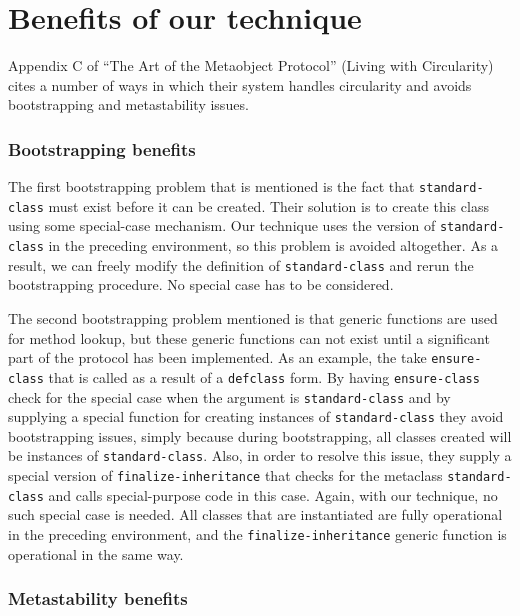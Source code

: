 \section{Benefits of our technique}
\label{sec-benefits}

Appendix C of ``The Art of the Metaobject Protocol''
\cite{Kiczales:1991:AMP:574212} (Living with Circularity) cites a
number of ways in which their system handles circularity and avoids
bootstrapping and metastability issues.

\subsubsection{Bootstrapping benefits}

The first bootstrapping problem that is mentioned is the fact that
\texttt{standard-class} must exist before it can be created.  Their
solution is to create this class using some special-case mechanism.
Our technique uses the version of \texttt{standard-class} in the
preceding environment, so this problem is avoided altogether.  As a
result, we can freely modify the definition of
\texttt{standard-class} and rerun the bootstrapping procedure.  No
special case has to be considered.

The second bootstrapping problem mentioned is that generic functions
are used for method lookup, but these generic functions can not exist
until a significant part of the protocol has been implemented.  As an
example, the take \texttt{ensure-class} that is called as a result of
a \texttt{defclass} form.  By having \texttt{ensure-class} check for
the special case when the argument is \texttt{standard-class} and by
supplying a special function for creating instances of
\texttt{standard-class} they avoid bootstrapping issues, simply
because during bootstrapping, all classes created will be instances of
\texttt{standard-class}.  Also, in order to resolve this issue, they
supply a special version of \texttt{finalize-inheritance} that checks
for the metaclass \texttt{standard-class} and calls special-purpose
code in this case.  Again, with our technique, no such special case is
needed.  All classes that are instantiated are fully operational in
the preceding environment, and the \texttt{finalize-inheritance}
generic function is operational in the same way.

\subsubsection{Metastability benefits}


